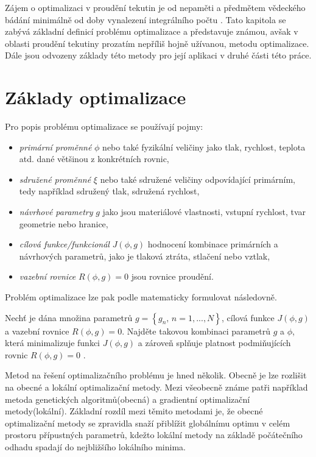 Zájem o optimalizaci v proudění tekutin je od nepaměti a předmětem vědeckého bádání minimálně od doby vynalezení integrálního počtu \cite{karman1997inverse}. Tato kapitola se zabývá základní definicí problému optimalizace a představuje známou, avšak v oblasti proudění tekutiny prozatím nepříliš hojně užívanou, metodu optimalizace. Dále jsou odvozeny základy této metody pro její aplikaci v druhé části této práce.
\section{Základy optimalizace}\label{sec:zaklady_opt}
Pro popis problému optimalizace se používají pojmy:
\begin{itemize}
	\item \textit{primární proměnné} $ \phi $ nebo také fyzikální veličiny jako tlak, rychlost, teplota atd. dané většinou z konkrétních rovnic,
	\item \textit{sdružené proměnné} $ \xi $ nebo také sdružené veličiny odpovídající primárním, tedy například sdružený tlak, sdružená rychlost,
	\item \textit{návrhové parametry} $ g $ jako jsou materiálové vlastnosti, vstupní rychlost, tvar geometrie nebo hranice,
	\item \textit{cílová funkce/funkcionál} $ J(\phi,g) $ hodnocení kombinace primárních a návrhových parametrů, jako je tlaková ztráta, stlačení nebo vztlak,
	\item \textit{vazební rovnice} $ R(\phi,g)=0 $ jsou rovnice proudění.
\end{itemize}
Problém optimalizace lze pak podle \cite{karman1997inverse} matematicky formulovat následovně. 
\begin{problem}\label{prob:optimalizace}
Nechť je dána množina parametrů $ g=\left\lbrace g_n, \, n=1,...,N\right\rbrace $, cílová funkce $ J(\phi, g) $ a vazební rovnice $ R(\phi, g)=0 $. 
Najděte takovou kombinaci parametrů $ g $ a $ \phi $, která minimalizuje funkci $ J(\phi, g) $ a zároveň splňuje platnost podmiňujících rovnic $ R(\phi, g)=0$ . 
\end{problem}
Metod na řešení optimalizačního problému je hned několik.
Obecně je lze rozlišit na obecné a lokální optimalizační metody. Mezi všeobecně známe patři například metoda genetických algoritmů(obecná) a gradientní optimalizační metody(lokální). 
Základní rozdíl mezi těmito metodami je, že obecné optimalizační metody se zpravidla snaží přiblížit globálnímu optimu v celém prostoru přípustných parametrů, kdežto lokální metody na základě počátečního odhadu spadají do nejbližšího lokálního minima.

